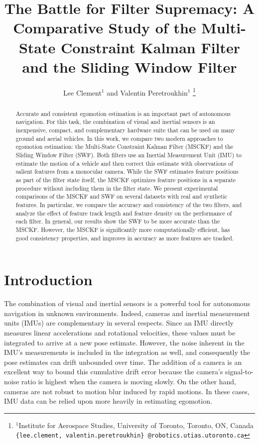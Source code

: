 \documentclass[letterpaper, 10 pt, conference]{ieeeconf}  %
\title{\LARGE \bf
The Battle for Filter Supremacy: A Comparative Study of the Multi-State Constraint Kalman Filter and the Sliding Window Filter
}
\author{Lee Clement$^{1}$ and Valentin Peretroukhin$^{1}$%
\thanks{$^{1}$Institute for Aerospace Studies,
        University of Toronto, Toronto, ON, Canada
        {\tt \{lee.clement, valentin.peretroukhin\} @robotics.utias.utoronto.ca}
        }%
}
\begin{document}
\maketitle
\thispagestyle{empty}
\pagestyle{empty}


\begin{abstract}
Accurate and consistent egomotion estimation is an important part of autonomous navigation.
For this task, the combination of visual and inertial sensors is an inexpensive, compact, and complementary hardware suite that can be used on many ground and aerial vehicles.
In this work, we compare two modern approaches to egomotion estimation: the Multi-State Constraint Kalman Filter (MSCKF) and the Sliding Window Filter (SWF).
Both filters use an Inertial Measurement Unit (IMU) to estimate the motion of a vehicle and then correct this estimate with observations of salient features from a monocular camera.
While the SWF estimates feature positions as part of the filter state itself, the MSCKF optimizes feature positions in a separate procedure without including them in the filter state.
We present experimental comparisons of the MSCKF and SWF on several datasets with real and synthetic features.
In particular, we compare the accuracy and consistency of the two filters, and analyze the effect of feature track length and feature density on the performance of each filter.
In general, our results show the SWF to be more accurate than the MSCKF.
However, the MSCKF is significantly more computationally efficient, has good consistency properties, and improves in accuracy as more features are tracked. 
\end{abstract}


\section{Introduction} \label{sec:introduction}

The combination of visual and inertial sensors is a powerful tool for autonomous navigation in unknown environments.
Indeed, cameras and inertial measurement units (IMUs) are complementary in several respects.
Since an IMU directly measures linear accelerations and rotational velocities, these values must be integrated to arrive at a new pose estimate.
However, the noise inherent in the IMU's measurements is included in the integration as well, and consequently the pose estimates can drift unbounded over time.
The addition of a camera is an excellent way to bound this cumulative drift error because the camera's signal-to-noise ratio is highest when the camera is moving slowly.
On the other hand, cameras are not robust to motion blur induced by rapid motions.
In these cases, IMU data can be relied upon more heavily in estimating egomotion.
\end{document}

